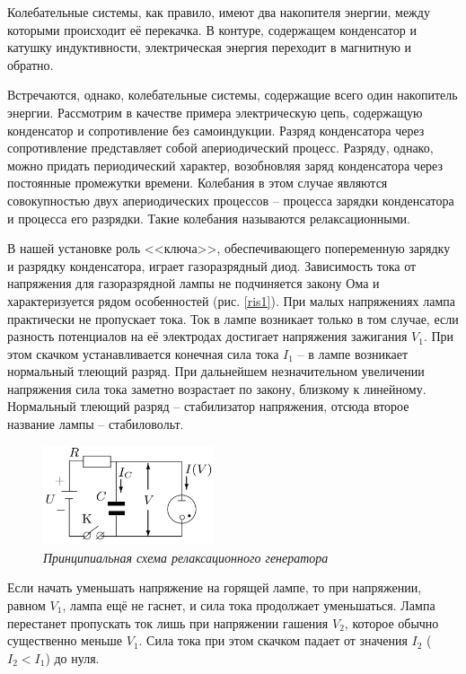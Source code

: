 \documentclass[a4paper,12pt]{article} %
\begin{document}
Колебательные системы, как правило, имеют два накопителя энергии, между которыми происходит её перекачка. В контуре, содержащем конденсатор и катушку индуктивности, электрическая энергия переходит в магнитную и обратно.

Встречаются, однако, колебательные системы, содержащие всего один накопитель энергии. Рассмотрим в качестве примера электрическую цепь, содержащую конденсатор и сопротивление без самоиндукции. Разряд конденсатора через сопротивление представляет собой апериодический процесс. Разряду, однако, можно придать периодический характер, возобновляя заряд конденсатора через постоянные промежутки времени. Колебания в этом случае являются совокупностью двух апериодических процессов -- процесса зарядки конденсатора и процесса его разрядки. Такие колебания называются релаксационными.

В нашей установке роль <<ключа>>, обеспечивающего попеременную зарядку и разрядку конденсатора, играет газоразрядный диод. Зависимость тока от напряжения для газоразрядной лампы не подчиняется закону Ома и характеризуется рядом особенностей (рис. \ref{ris1}). При малых напряжениях лампа практически не пропускает тока. Ток в лампе возникает только в том случае, если разность потенциалов на её электродах достигает напряжения зажигания $ V_1 $. При этом скачком устанавливается конечная сила тока $ I_1 $ -- в лампе возникает нормальный тлеющий разряд. При дальнейшем незначительном увеличении напряжения сила тока заметно возрастает по закону, близкому к линейному. Нормальный тлеющий разряд -- стабилизатор напряжения, отсюда второе название лампы -- стабиловольт.

\begin{figure}
	\includegraphics[width=5cm]{ris2.jpg}
	\caption{\textit{Принципиальная схема релаксационного генератора}}
	\label{ris2}
\end{figure}

Если начать уменьшать напряжение на горящей лампе, то при напряжении, равном $ V_1 $, лампа ещё не гаснет, и сила тока продолжает уменьшаться. Лампа перестанет пропускать ток лишь при напряжении гашения $ V_2 $, которое обычно существенно меньше $ V_1 $. Сила тока при этом скачком падает от значения $ I_2 $ ($ I_2 < I_1 $) до нуля.
\end{document}
